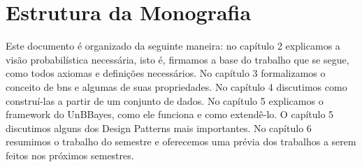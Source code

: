 \section{Estrutura da Monografia}
Este documento é organizado da seguinte maneira: no capítulo 2 explicamos a visão probabilística necessária, isto é, firmamos a base do trabalho que se segue, como todos axiomas e definições necessários. No capítulo 3 formalizamos o conceito de \glspl{bn} e algumas de suas propriedades. No capítulo 4 discutimos como construí-las a partir de um conjunto de dados. No capítulo 5 explicamos o framework do UnBBayes, como ele funciona e como extendê-lo. O capítulo 5 discutimos alguns dos Design Patterns mais importantes. No capítulo 6 resumimos o trabalho do semestre e oferecemos uma prévia dos trabalhos a serem feitos nos próximos semestres.


